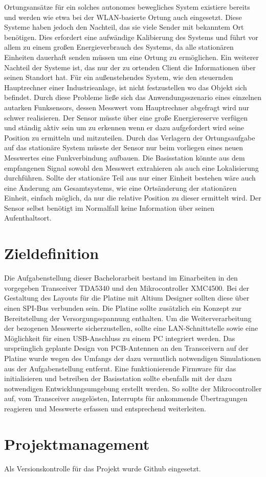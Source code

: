 Ortungsansätze für ein solches autonomes bewegliches System existiere bereits und werden wie etwa bei der WLAN-basierte Ortung auch eingesetzt. Diese Systeme haben jedoch den Nachteil, das sie viele Sender mit bekanntem Ort benötigen. Dies erfordert eine aufwändige Kalibierung des Systems und führt vor allem zu einem großen Energieverbrauch des Systems, da alle stationären Einheiten dauerhaft senden müssen um eine Ortung zu ermöglichen.
Ein weiterer Nachteil der Systeme ist, das nur der zu ortenden Client die Informationen über seinen Standort hat. Für ein außenstehendes System, wie den steuernden Hauptrechner einer Industrieanlage, ist nicht festzustellen wo das Objekt sich befindet. %
Durch diese Probleme ließe sich das Anwendungsszenario eines einzelnen autarken Funksensors, dessen Messwert vom Hauptrechner abgefragt wird nur schwer realisieren. Der Sensor müsste über eine große Energiereserve verfügen und ständig aktiv sein um zu erkennen wenn er dazu aufgefordert wird seine Position zu ermitteln und mitzuteilen.
Durch das Verlagern der Ortungsaufgabe auf das stationäre System müsste der Sensor nur beim vorliegen eines neuen Messwertes eine Funkverbindung aufbauen. Die Basisstation könnte aus dem empfangenen Signal sowohl den Messwert extrahieren als auch eine Lokalisierung durchführen.
Sollte der stationäre Teil  aus nur einer Einheit bestehen wäre auch eine Änderung am Gesamtsystems, wie eine Ortsänderung der stationären Einheit, einfach möglich, da nur die relative Position zu dieser ermittelt wird. Der Sensor selbst benötigt im Normalfall keine Information über seinen Aufenthaltsort.
\section{Zieldefinition}
Die Aufgabenstellung dieser Bachelorarbeit bestand im Einarbeiten in den vorgegeben Transceiver TDA5340 und den Mikrocontroller XMC4500. Bei der Gestaltung des Layouts für die Platine mit Altium Designer sollten diese über einen SPI-Bus verbunden sein. Die Platine sollte zusätzlich ein Konzept zur Bereitstellung der Versorgungsspannung enthalten. Um die Weiterverarbeitung der bezogenen Messwerte sicherzustellen, sollte eine LAN-Schnittstelle sowie eine Möglichkeit für einen USB-Anschluss zu einem PC integriert werden.
Das ursprünglich geplante Design von PCB-Antennen an den Transceivern auf der Platine wurde wegen des Umfangs der dazu vermutlich notwendigen Simulationen aus der Aufgabenstellung entfernt.
Eine funktionierende Firmware für das initialisieren und betreiben der Basisstation sollte ebenfalls mit der dazu notwendigen Entwicklungsumgebung erstellt werden. So sollte der Mikrocontroller auf, vom Transceiver ausgelösten, Interrupts für ankommende Übertragungen reagieren und Messwerte erfassen und entsprechend weiterleiten.


\section{Projektmanagement}
Als Versionskontrolle für das Projekt wurde Github eingesetzt.